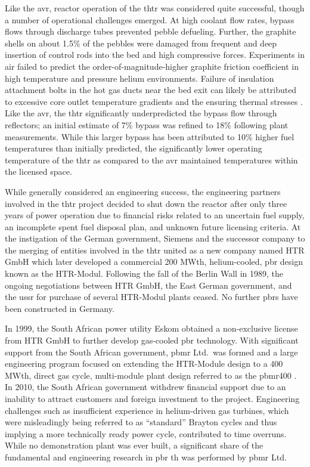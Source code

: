 Like the \gls{avr}, reactor operation of the \gls{thtr} was considered quite successful, though a number of operational challenges emerged. At high coolant flow rates, bypass flows through discharge tubes prevented pebble defueling. Further, the graphite shells on about 1.5\% of the pebbles were damaged from frequent and deep insertion of control rods into the bed and high compressive forces. Experiments in air failed to predict the order-of-magnitude-higher graphite friction coefficient in high temperature and pressure helium environments. Failure of insulation attachment bolts in the hot gas ducts near the bed exit can likely be attributed to excessive core outlet temperature gradients and the ensuring thermal stresses \cite{moormann}. Like the \gls{avr}, the \gls{thtr} significantly underpredicted the bypass flow through reflectors; an initial estimate of 7\% bypass was refined to 18\% following plant measurements. While this larger bypass has been attributed to 10\% higher fuel temperatures than initially predicted, the significantly lower operating temperature of the \gls{thtr} as compared to the \gls{avr} maintained temperatures within the licensed space.

While generally considered an engineering success, the engineering partners involved in the \gls{thtr} project decided to shut down the reactor after only three years of power operation due to financial risks related to an uncertain fuel supply, an incomplete spent fuel disposal plan, and unknown future licensing criteria. At the instigation of the German government, Siemens and the successor company to the merging of entities involved in the \gls{thtr} united as a new company named HTR GmbH which later developed a commercial 200 MWth, helium-cooled, \gls{pbr} design known as the HTR-Modul. Following the fall of the Berlin Wall in 1989, the ongoing negotiations between HTR GmbH, the East German government, and the \gls{ussr} for purchase of several HTR-Modul plants ceased. No further \glspl{pbr} have been constructed in Germany.

In 1999, the South African power utility Eskom obtained a non-exclusive license from HTR GmbH to further develop gas-cooled \gls{pbr} technology. With significant support from the South African government, \gls{pbmr} Ltd.\ was formed and a large engineering program focused on extending the HTR-Module design to a 400 MWth, direct gas cycle, multi-module plant design referred to as the \gls{pbmr400} \cite{thomas, koster}. %
 In 2010, the South African government withdrew financial support due to an inability to attract customers and foreign investment to the project. Engineering challenges such as insufficient experience in helium-driven gas turbines, which were misleadingly being referred to as ``standard'' Brayton cycles and thus implying a more technically ready power cycle, contributed to time overruns. While no demonstration plant was ever built, a significant share of the fundamental and engineering research in \gls{pbr} \gls{th} was performed by \gls{pbmr} Ltd.

